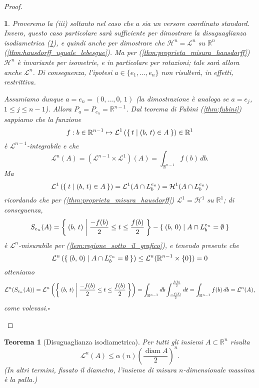\documentclass[a4paper,10pt,openright,oneside]{book}
\theoremstyle{theoremstyle}
\newtheorem{teorema}{Teorema}[section]
\theoremstyle{theoremstylewoheader}
\theoremstyle{theoremstyle}
\theoremstyle{proofsecstyle}
\newtheorem{proofsec}{}
\theoremstyle{nonumberplain}
\newtheorem{proof}{Dim.}
\newcommand{\RR}{\ensuremath{\mathbb{R}}}
\newcommand{\Leb}{\ensuremath{\mathcal{L}}}
\newcommand{\Haus}{\ensuremath{\mathcal{H}}}
\DeclareMathOperator{\diam}{diam}
\renewcommand{\qedsymbol}{\ensuremath{\square}}
\newcommand{\qed}{\unskip\nobreak\hfill\nobreak\hspace{.5em}\qedsymbol}
\begin{document}
\begin{proof}
\begin{proofsec}
Proveremo la (iii) soltanto nel caso che $a$ sia un versore coordinato standard. Invero, questo caso particolare sarà sufficiente per dimostrare la disuguaglianza isodiametrica (\ref{thm:disuguaglianza_isodiametrica}), e quindi anche per dimostrare che $\Haus^n = \Leb^n$ su $\RR^n$ (\ref{thm:hausdorff_uguale_lebesgue}). Ma per (\ref{thm:proprieta_misura_hausdorff}) $\Haus^n$ è invariante per isometrie, e in particolare per rotazioni; tale sarà allora anche $\Leb^n$. Di conseguenza, l'ipotesi $a \in \{e_1, \ldots, e_n\}$ non risulterà, in effetti, restrittiva.

Assumiamo dunque $a = e_n = (0, \ldots, 0,\, 1)$ (la dimostrazione è analoga se $a = e_j$, $1 \le j \le n-1$). Allora $P_a = P_{e_n} = \RR^{n-1}$. Dal teorema di Fubini (\ref{thm:fubini}) sappiamo che la funzione
\[
f : b \in \RR^{n-1} \mapsto \Leb^1\left(\Set{ t | (b,\, t) \in A }\right) \in \RR^1 
\]
è $\Leb^{n-1}$-integrabile e che
\[
\Leb^n(A) = (\Leb^{n-1}\times\Leb^1)(A) = \int_{\RR^{n-1}} f(b)\, db. 
\]
Ma
\[
\Leb^1\left(\Set{ t | (b,\, t) \in A }\right) = \Leb^1(A \cap L_b^{e_n}) = \Haus^1(A \cap L_b^{e_n})
\]
ricordando che per (\ref{thm:proprieta_misura_hausdorff}) $\Leb^1 = \Haus^1$ su $\RR^1$; di conseguenza, 
\[
S_{e_n}(A) = \Set{ (b,\, t) | \frac{-f(b)}{2} \le t \le \frac{f(b)}{2} } - \Set{ (b,\, 0) | A \cap L_b^{e_n} = \emptyset }
\]
è $\Leb^n$-misurabile per (\ref{lem:regione_sotto_il_grafico}), e tenendo presente che
\[
\Leb^n\left(\Set{ (b,\, 0) | A \cap L_b^{e_n} = \emptyset }\right) \le \Leb^n(\RR^{n-1} \times \{0\}) = 0
\]
otteniamo
\[
\Leb^n(S_{e_n}(A)) = \Leb^n\left(\Set{ (b,\, t) | \frac{-f(b)}{2} \le t \le \frac{f(b)}{2} }\right) = \int_{\RR^{n-1}} db \int_\frac{-f(b)}{2}^\frac{f(b)}{2} dt = \int_{\RR^{n-1}} f(b)\, db = \Leb^n(A),
\]
come volevasi.\qed
\end{proofsec}
\end{proof}

\begin{teorema}[Disuguaglianza isodiametrica]
\label{thm:disuguaglianza_isodiametrica}
Per tutti gli insiemi $A \subset \RR^n$ risulta
\[
\Leb^n(A) \le \alpha(n) \left(\frac{\diam A}{2}\right)^n.
\]
(In altri termini, fissato il diametro, l'insieme di misura $n$-dimensionale massima è la palla.)
\end{teorema}
\end{document}
